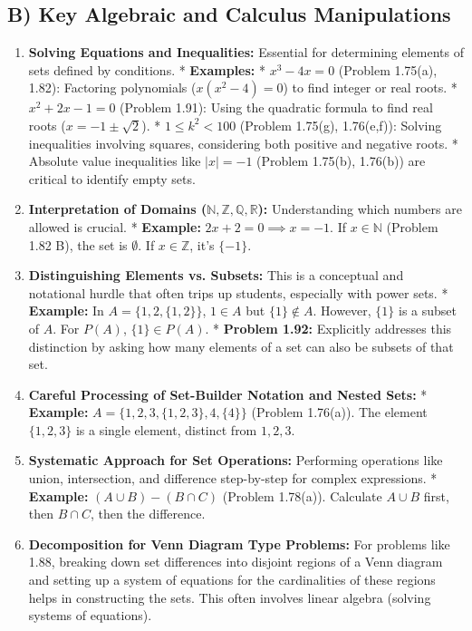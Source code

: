 \documentclass{article}
\begin{document}
\begin{itemize}
\begin{itemize}
\begin{itemize}
\begin{enumerate}
\subsection{B) Key Algebraic and Calculus Manipulations}
\begin{enumerate}
    \item \textbf{Solving Equations and Inequalities:} Essential for determining elements of sets defined by conditions.
        *   \textbf{Examples:}
            *   $x^3 - 4x = 0$ (Problem 1.75(a), 1.82): Factoring polynomials ($x(x^2-4)=0$) to find integer or real roots.
            *   $x^2 + 2x - 1 = 0$ (Problem 1.91): Using the quadratic formula to find real roots ($x = -1 \pm \sqrt{2}$).
            *   $1 \le k^2 < 100$ (Problem 1.75(g), 1.76(e,f)): Solving inequalities involving squares, considering both positive and negative roots.
            *   Absolute value inequalities like $|x|=-1$ (Problem 1.75(b), 1.76(b)) are critical to identify empty sets.
    \item \textbf{Interpretation of Domains ($\mathbb{N}, \mathbb{Z}, \mathbb{Q}, \mathbb{R}$):} Understanding which numbers are allowed is crucial.
        *   \textbf{Example:} $2x+2=0 \implies x=-1$. If $x \in \mathbb{N}$ (Problem 1.82 B), the set is $\emptyset$. If $x \in \mathbb{Z}$, it's $\{-1\}$.
    \item \textbf{Distinguishing Elements vs. Subsets:} This is a conceptual and notational hurdle that often trips up students, especially with power sets.
        *   \textbf{Example:} In $A = \{1, 2, \{1, 2\}\}$, $1 \in A$ but $\{1\} \notin A$. However, $\{1\}$ is a subset of $A$. For $P(A)$, $\{1\} \in P(A)$.
        *   \textbf{Problem 1.92:} Explicitly addresses this distinction by asking how many elements of a set can also be subsets of that set.
    \item \textbf{Careful Processing of Set-Builder Notation and Nested Sets:}
        *   \textbf{Example:} $A = \{1, 2, 3, \{1, 2, 3\}, 4, \{4\}\}$ (Problem 1.76(a)). The element $\{1, 2, 3\}$ is a single element, distinct from $1, 2, 3$.
    \item \textbf{Systematic Approach for Set Operations:} Performing operations like union, intersection, and difference step-by-step for complex expressions.
        *   \textbf{Example:} $(A \cup B) - (B \cap C)$ (Problem 1.78(a)). Calculate $A \cup B$ first, then $B \cap C$, then the difference.
    \item \textbf{Decomposition for Venn Diagram Type Problems:} For problems like 1.88, breaking down set differences into disjoint regions of a Venn diagram and setting up a system of equations for the cardinalities of these regions helps in constructing the sets. This often involves linear algebra (solving systems of equations).
\end{enumerate}


\end{enumerate}
\end{itemize}
\end{itemize}
\end{itemize}
\end{document}
